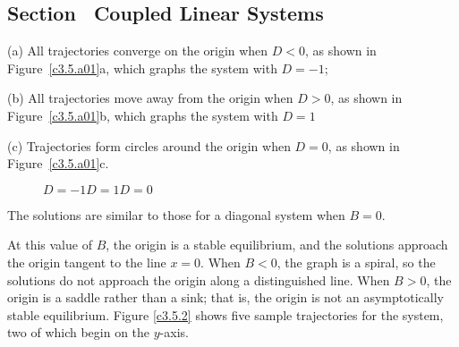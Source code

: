 \begin{figure}[htb]
			\centerline{%
			}
\end{figure}



\newpage
\subsection*{Section~\protect{\ref{s:3.5}} Coupled Linear Systems}

(a) All trajectories converge on the origin when $D < 0$, as shown in
Figure~\ref{c3.5.a01}a, which graphs the system with $D =- 1$;

(b) All trajectories move away from the origin when $D > 0$, as shown in
Figure~\ref{c3.5.a01}b, which graphs the system with $D = 1$

(c) Trajectories form circles around the origin when $D = 0$, as shown in
Figure~\ref{c3.5.a01}c.

\begin{figure}[htb]
                       \centerline{%
                       }
	\centerline{$D = -1$\hspace{1.4in}$D = 1$\hspace{1.4in}$D = 0$}
\end{figure}

\ans The solutions are similar to those for a diagonal system when
$B = 0$.

\soln At this value of $B$, the origin is a stable equilibrium, and the
solutions approach the origin tangent to the line $x = 0$.  When $B < 0$,
the graph is a spiral, so the solutions do not approach the origin along
a distinguished line.  When $B > 0$, the origin is a saddle rather
than a sink; that is, the origin is not an asymptotically stable
equilibrium.  Figure \ref{c3.5.2} shows five sample trajectories
for the system, two of which begin on the $y$-axis.

\begin{figure}[htb]
                       \centerline{%
                       }
\end{figure}


